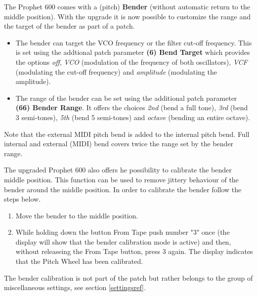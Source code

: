 The Prophet 600 comes with a (pitch) \textbf{Bender} (without automatic return to the middle position). With the upgrade it is now possible to customize the range and the target of the bender as part of a patch.

\begin{itemize}
  \item The bender can target the VCO frequency or the filter cut-off frequency. This is set using the addtional patch parameter \textbf{(6) Bend Target} which provides the options \textit{off}, \textit{VCO} (modulation of the frequency of both oscillators), \textit{VCF} (modulating the cut-off frequency) and \textit{amplitude} (modulating the amplitude).
  \item The range of the bender can be set using the additional patch parameter \textbf{(66) Bender Range}. It offers the choices \textit{2nd} (bend a full tone), \textit{3rd} (bend 3 semi-tones), \textit{5th} (bend 5 semi-tones) and \textit{octave} (bending an entire octave).
\end{itemize}

Note that the external MIDI pitch bend is added to the internal pitch bend. Full internal and external (MIDI) bend covers twice the range set by the bender range.

The upgraded Prophet 600 also offers he possibility to calibrate the bender middle position. This function can be used to remove jittery behaviour of the bender around the middle position. In order to calibrate the bender follow the steps below.

\begin{enumerate}
  \item Move the bender to the middle position.  
  \item While holding down the button From Tape push number "3" once (the display will show that the bender calibration mode is active) and then, without releaseing the From Tape button, press 3 again. The display indicates that the Pitch Wheel has been calibrated. 
\end{enumerate}

The bender calibration is not part of the patch but rather belongs to the group of miscellaneous settings, see section \ref{settingsref}. 
